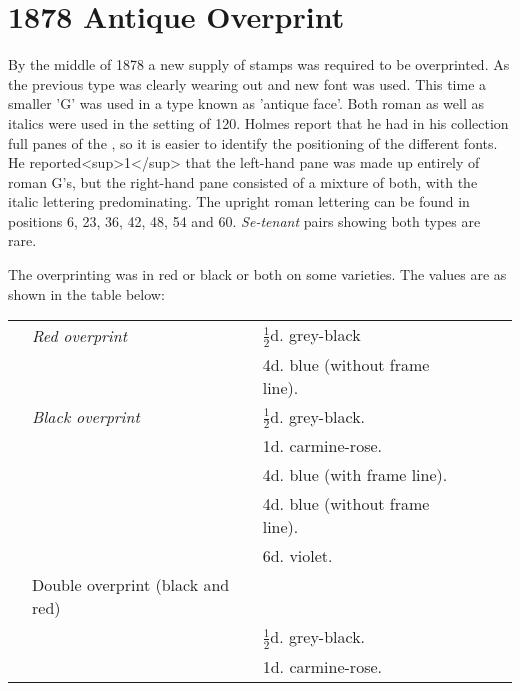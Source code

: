 \chapter{1878 Antique Overprint}    

By the middle of 1878 a new supply of stamps was required to be overprinted. As the previous type was clearly wearing out and new font was used. This time a smaller 'G' was used in a type known as 'antique face'. Both roman as well as italics were used in the setting of 120. Holmes report that he had in his collection full panes of the \halfd, so it is easier to identify the positioning of the different fonts.  He reported<sup>1</sup> that the left-hand pane was made up entirely of roman G's, but the right-hand pane consisted of a mixture of both, with the italic lettering predominating.
The upright roman lettering can be found in positions 6, 23, 36, 42, 48, 54 and 60. \textit{Se-tenant} pairs showing both types are rare.

The overprinting was in red or black or both on some varieties. The values are as shown in the table below:

\begin{tabular}{llllll}
  &\textit{Red overprint}   &$\frac{1}{2}$d. grey-black &&&\\
  &                         &4d. blue (without frame line).&&&\\
  &\textit{Black overprint} &$\frac{1}{2}$d. grey-black.&&&\\
  &                         &1d. carmine-rose.&&&\\
  &                         &4d. blue (with frame line).&&&\\
  &                         &4d. blue (without frame line).&&&\\
  &                         &6d. violet.&&&\\
  &Double overprint (black and red)        &&&&\\
  &                         &$\frac{1}{2}$d. grey-black.&&&\\
  &                         &1d. carmine-rose.&&&\\
\end{tabular}




